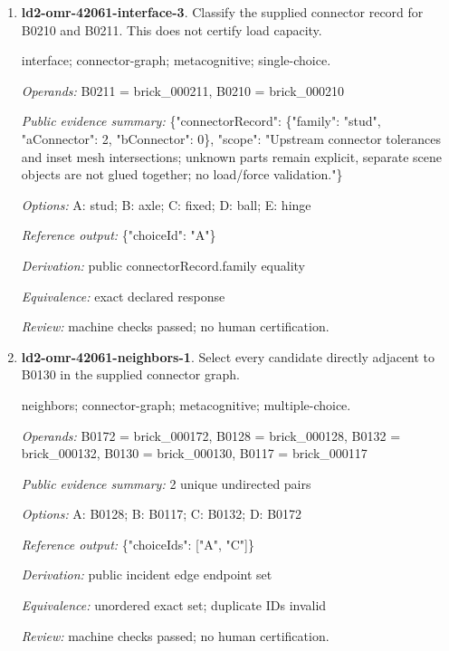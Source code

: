 \begin{enumerate}
\par{\small interface; connector-graph; metacognitive; single-choice.\par\textit{Operands:} B0261 = brick\_000261, B0260 = brick\_000260\par\textit{Public evidence summary:} \{"connectorRecord": \{"family": "fixed", "aConnector": 2, "bConnector": 0\}, "scope": "Upstream connector tolerances and inset mesh intersections; unknown parts remain explicit, separate scene objects are not glued together; no load/force validation."\}\par\textit{Options:} A: hinge; B: ball; C: fixed; D: axle; E: stud\par\textit{Reference output:} \{"choiceId": "C"\}\par\textit{Derivation:} public connectorRecord.family equality\par\textit{Equivalence:} exact declared response\par\textit{Review:} machine checks passed; no human certification.}
\item \textbf{ld2-omr-42061-interface-3}. Classify the supplied connector record for B0210 and B0211. This does not certify load capacity.
\par{\small interface; connector-graph; metacognitive; single-choice.\par\textit{Operands:} B0211 = brick\_000211, B0210 = brick\_000210\par\textit{Public evidence summary:} \{"connectorRecord": \{"family": "stud", "aConnector": 2, "bConnector": 0\}, "scope": "Upstream connector tolerances and inset mesh intersections; unknown parts remain explicit, separate scene objects are not glued together; no load/force validation."\}\par\textit{Options:} A: stud; B: axle; C: fixed; D: ball; E: hinge\par\textit{Reference output:} \{"choiceId": "A"\}\par\textit{Derivation:} public connectorRecord.family equality\par\textit{Equivalence:} exact declared response\par\textit{Review:} machine checks passed; no human certification.}
\item \textbf{ld2-omr-42061-neighbors-1}. Select every candidate directly adjacent to B0130 in the supplied connector graph.
\par{\small neighbors; connector-graph; metacognitive; multiple-choice.\par\textit{Operands:} B0172 = brick\_000172, B0128 = brick\_000128, B0132 = brick\_000132, B0130 = brick\_000130, B0117 = brick\_000117\par\textit{Public evidence summary:} 2 unique undirected pairs\par\textit{Options:} A: B0128; B: B0117; C: B0132; D: B0172\par\textit{Reference output:} \{"choiceIds": ["A", "C"]\}\par\textit{Derivation:} public incident edge endpoint set\par\textit{Equivalence:} unordered exact set; duplicate IDs invalid\par\textit{Review:} machine checks passed; no human certification.}

\end{enumerate}
